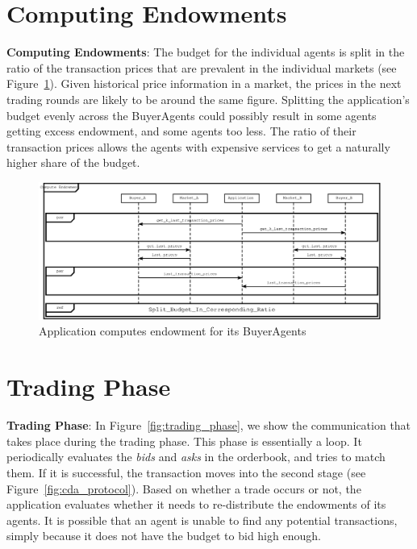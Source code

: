 \documentclass[10pt,journal,compsoc]{IEEEtran}
\begin{document}
\section{Computing Endowments}
\textbf{Computing Endowments}: The budget for the individual agents is split in the ratio of the transaction prices that are prevalent in the individual markets (see Figure~\ref{fig:compute_endowment}). Given historical price information in a market, the prices in the next trading rounds are likely to be around the same figure. Splitting the application's budget evenly across the BuyerAgents could possibly result in some agents getting excess endowment, and some agents too less. The ratio of their transaction prices allows the agents with expensive services to get a naturally higher share of the budget.
\begin{figure}[h]
\centering
\includegraphics[scale=0.7]{Figure25.eps}
\caption{Application computes endowment for its BuyerAgents \label{fig:compute_endowment}}
\end{figure}

\section{Trading Phase}
\textbf{Trading Phase}: In Figure~\ref{fig:trading_phase}, we show the communication that takes place during the trading phase. This phase is essentially a loop. It periodically evaluates the \textit{bids} and \textit{asks} in the orderbook, and tries to match them. If it is successful, the transaction moves into the second stage (see Figure~\ref{fig:cda_protocol}). Based on whether a trade occurs or not, the application evaluates whether it needs to re-distribute the endowments of its agents. It is possible that an agent is unable to find any potential transactions, simply because it does not have the budget to bid high enough.
\end{document}
